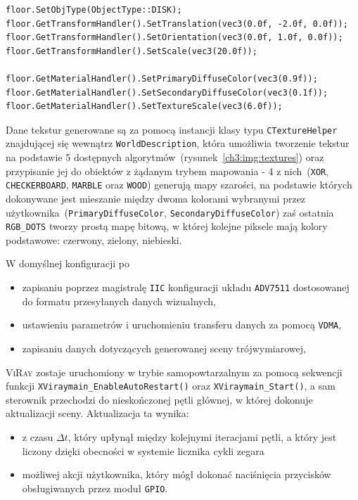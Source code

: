 \begin{lstlisting}[caption=Przykład konfiguracji obiektu \texttt{floor}. Za pomocą odpowiednich funkcji \texttt{Set*()} można dokonać zmiany wartości dowolnych parametrów interpretowanych przez \textsc{ViRay()}]
floor.SetObjType(ObjectType::DISK);
floor.GetTransformHandler().SetTranslation(vec3(0.0f, -2.0f, 0.0f));
floor.GetTransformHandler().SetOrientation(vec3(0.0f, 1.0f, 0.0f));
floor.GetTransformHandler().SetScale(vec3(20.0f));

floor.GetMaterialHandler().SetPrimaryDiffuseColor(vec3(0.9f));
floor.GetMaterialHandler().SetSecondaryDiffuseColor(vec3(0.1f));
floor.GetMaterialHandler().SetTextureScale(vec3(6.0f));
\end{lstlisting}

Dane tekstur generowane są za pomocą instancji klasy typu \texttt{CTextureHelper} znajdującej się wewnątrz \texttt{WorldDescription}, która umożliwia tworzenie tekstur na podstawie 5 dostępnych algorytmów~(rysunek~\ref{ch3:img:textures}) oraz przypisanie jej do obiektów z żądanym trybem mapowania - 4 z nich~(\texttt{XOR}, \texttt{CHECKERBOARD}, \texttt{MARBLE} oraz \texttt{WOOD}) generują mapy szarości, na podstawie których dokonywane jest mieszanie między dwoma kolorami wybranymi przez użytkownika~(\texttt{PrimaryDiffuseColor}, \texttt{SecondaryDiffuseColor}) zaś ostatnia \texttt{RGB\_DOTS} tworzy prostą mapę bitową, w której kolejne piksele mają kolory podstawowe: czerwony, zielony, niebieski.

W domyślnej konfiguracji po
\begin{itemize}
\item zapisaniu poprzez magistralę \texttt{IIC} konfiguracji układu \texttt{ADV7511} dostosowanej do formatu przesyłanych danych wizualnych,
\item ustawieniu parametrów i uruchomieniu transferu danych za pomocą \texttt{VDMA},
\item zapisaniu danych dotyczących generowanej sceny trójwymiarowej,
\end{itemize}
\textsc{ViRay} zostaje uruchomiony w trybie samopowtarzalnym za pomocą sekwencji funkcji \texttt{XViraymain\_EnableAutoRestart()} oraz \texttt{XViraymain\_Start()}, a sam sterownik przechodzi do nieskończonej pętli głównej, w której dokonuje aktualizacji sceny. Aktualizacja ta wynika:
\begin{itemize}
\item z czasu $\Delta t$, który upłynął między kolejnymi iteracjami pętli, a który jest liczony dzięki obecności w systemie licznika cykli zegara
\item możliwej akcji użytkownika, który mógł dokonać naciśnięcia przycisków obsługiwanych przez moduł \texttt{GPIO}.
\end{itemize}

